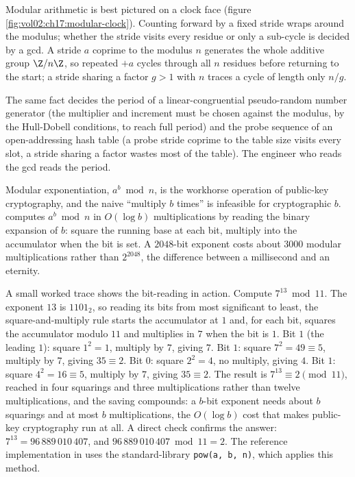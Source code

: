 Modular arithmetic is best pictured on a clock face (figure
\ref{fig:vol02:ch17:modular-clock}). Counting forward by a fixed
stride wraps around the modulus; whether the stride visits every
residue or only a sub-cycle is decided by a gcd. A stride $a$
coprime to the modulus $n$ generates the whole additive group
$\Z/n\Z$, so repeated $+a$ cycles through all $n$ residues before
returning to the start; a stride sharing a factor $g > 1$ with $n$
traces a cycle of length only $n/g$.



The same fact decides the period of a linear-congruential
pseudo-random number generator (the multiplier and increment must be
chosen against the modulus, by the Hull-Dobell conditions, to reach
full period) and the probe sequence of an open-addressing hash table
(a probe stride coprime to the table size visits every slot, a
stride sharing a factor wastes most of the table). The engineer who
reads the gcd reads the period.

Modular exponentiation, $a^{b} \bmod n$, is the workhorse operation
of public-key cryptography, and the naive ``multiply $b$ times'' is
infeasible for cryptographic $b$.  computes $a^{b} \bmod n$ in $O(\log b)$ multiplications by
reading the binary expansion of $b$: square the running base at each
bit, multiply into the accumulator when the bit is set. A $2048$-bit
exponent costs about $3000$ modular multiplications rather than
$2^{2048}$, the difference between a millisecond and an eternity.

A small worked trace shows the bit-reading in action. Compute
$7^{13} \bmod 11$. The exponent $13$ is $1101_{2}$, so reading its
bits from most significant to least, the square-and-multiply rule
starts the accumulator at $1$ and, for each bit, squares the
accumulator modulo $11$ and multiplies in $7$ when the bit is $1$.
Bit $1$ (the leading $1$): square $1^{2} = 1$, multiply by $7$, giving
$7$. Bit $1$: square $7^{2} = 49 \equiv 5$, multiply by $7$, giving
$35 \equiv 2$. Bit $0$: square $2^{2} = 4$, no multiply, giving $4$.
Bit $1$: square $4^{2} = 16 \equiv 5$, multiply by $7$, giving $35
\equiv 2$. The result is $7^{13} \equiv 2 \pmod{11}$, reached in four
squarings and three multiplications rather than twelve
multiplications, and the saving compounds: a $b$-bit exponent needs
about $b$ squarings and at most $b$ multiplications, the $O(\log b)$
cost that makes public-key cryptography run at all. A direct check
confirms the answer: $7^{13} = 96\,889\,010\,407$, and $96\,889\,010\,407
\bmod 11 = 2$.
The reference implementation in
uses the standard-library \texttt{pow(a, b, n)}, which applies this
method.

